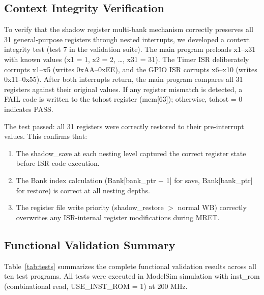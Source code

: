\documentclass[letterpaper,journal]{IEEEtran}
\begin{document}
\subsection{Context Integrity Verification}

To verify that the shadow register multi-bank mechanism correctly preserves all 31 general-purpose registers through nested interrupts, we developed a context integrity test (test 7 in the validation suite).
The main program preloads x1--x31 with known values (x1 = 1, x2 = 2, \ldots, x31 = 31).
The Timer ISR deliberately corrupts x1--x5 (writes 0xAA--0xEE), and the GPIO ISR corrupts x6--x10 (writes 0x11--0x55).
After both interrupts return, the main program compares all 31 registers against their original values.
If any register mismatch is detected, a FAIL code is written to the tohost register (mem[63]); otherwise, tohost = 0 indicates PASS.

The test passed: all 31 registers were correctly restored to their pre-interrupt values.
This confirms that:
\begin{enumerate}
\item The shadow\_save at each nesting level captured the correct register state before ISR code execution.
\item The Bank index calculation (Bank[bank\_ptr $-$ 1] for save, Bank[bank\_ptr] for restore) is correct at all nesting depths.
\item The register file write priority (shadow\_restore $>$ normal WB) correctly overwrites any ISR-internal register modifications during MRET.
\end{enumerate}

\subsection{Functional Validation Summary}

Table~\ref{tab:tests} summarizes the complete functional validation results across all ten test programs.
All tests were executed in ModelSim simulation with inst\_rom (combinational read, USE\_INST\_ROM = 1) at 200 MHz.
\end{document}

